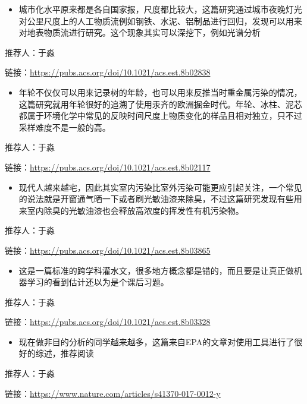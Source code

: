 \documentclass[]{book}
\providecommand{\tightlist}{%
  \setlength{\itemsep}{0pt}\setlength{\parskip}{0pt}}
\begin{document}
\begin{itemize}
\tightlist
\item
  城市化水平原来都是各自国家报，尺度都比较大，这篇研究通过城市夜晚灯光对公里尺度上的人工物质流例如钢铁、水泥、铝制品进行回归，发现可以用来对地表物质流进行研究。这个现象其实可以深挖下，例如光谱分析
\end{itemize}

推荐人：于淼

链接：\url{https://pubs.acs.org/doi/10.1021/acs.est.8b02838}

\begin{itemize}
\tightlist
\item
  年轮不仅仅可以用来记录树的年龄，也可以用来反推当时重金属污染的情况，这篇研究就用年轮很好的追溯了使用汞齐的欧洲掘金时代。年轮、冰柱、泥芯都属于环境化学中常见的反映时间尺度上物质变化的样品且相对独立，只不过采样难度不是一般的高。
\end{itemize}

推荐人：于淼

链接：\url{https://pubs.acs.org/doi/10.1021/acs.est.8b02117}

\begin{itemize}
\tightlist
\item
  现代人越来越宅，因此其实室内污染比室外污染可能更应引起关注，一个常见的说法就是开窗通气晒一下或者刷光敏油漆来除臭，不过这篇研究发现有些用来室内除臭的光敏油漆也会释放高浓度的挥发性有机污染物。
\end{itemize}

推荐人：于淼

链接：\url{https://pubs.acs.org/doi/10.1021/acs.est.8b03865}

\begin{itemize}
\tightlist
\item
  这是一篇标准的跨学科灌水文，很多地方概念都是错的，而且要是让真正做机器学习的看到估计还以为是个课后习题。
\end{itemize}

推荐人：于淼

链接：\url{https://pubs.acs.org/doi/10.1021/acs.est.8b03328}

\begin{itemize}
\tightlist
\item
  现在做非目的分析的同学越来越多，这篇来自EPA的文章对使用工具进行了很好的综述，推荐阅读
\end{itemize}

推荐人：于淼

链接：\url{https://www.nature.com/articles/s41370-017-0012-y}
\end{document}
